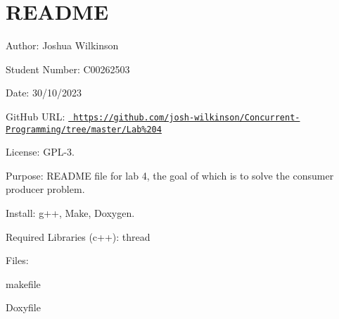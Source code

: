 \chapter{README}
\hypertarget{md__r_e_a_d_m_e}{}\label{md__r_e_a_d_m_e}
\label{md__r_e_a_d_m_e_autotoc_md0}%
%
 Author\+: Joshua Wilkinson

Student Number\+: C00262503

Date\+: 30/10/2023

Git\+Hub URL\+: \href{https://github.com/josh-wilkinson/Concurrent-Programming/tree/master/Lab\%204}{\texttt{ https\+://github.\+com/josh-\/wilkinson/\+Concurrent-\/\+Programming/tree/master/\+Lab\%204}}

License\+: GPL-\/3.

Purpose\+: README file for lab 4, the goal of which is to solve the consumer producer problem.

Install\+: g++, Make, Doxygen.

Required Libraries (c++)\+: thread

Files\+:
\begin{DoxyItemize}
\item {}
\item {}
\item {}
\item {}
\item {}
\item makefile
\item Doxyfile
\item {} 
\end{DoxyItemize}